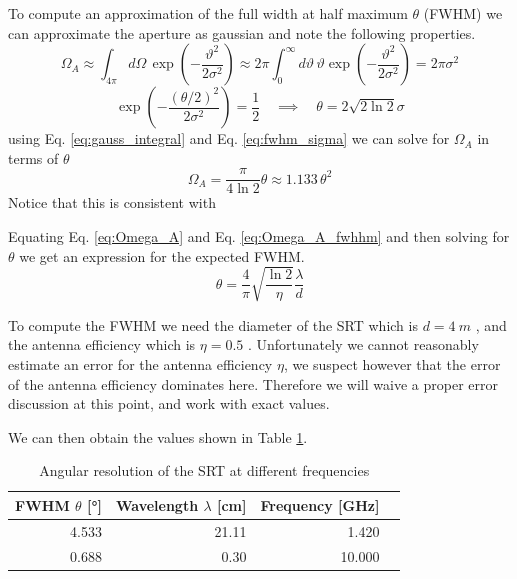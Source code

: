To compute an approximation of the full width at half maximum $\theta$ (FWHM) we can approximate the aperture as gaussian \cite[p. 2]{srt} and note the following properties.
\begin{equation}
    \Omega_A \approx \int_{4\pi } d\Omega\, \exp{\left( -\frac{\vartheta^2}{2\sigma^2} \right)} \approx 2\pi \int_0^{\infty} d\vartheta \, \vartheta \exp{\left( -\frac{\vartheta^2}{2\sigma^2} \right)} = 2\pi \sigma^2
    \label{eq:gauss_integral}
\end{equation}
\begin{equation}
    \exp{\left( -\frac{(\theta/2)^2}{2\sigma^2}\right)} = \frac{1}{2} \quad \implies \quad \theta = 2 \sqrt{2\ln{2}} \sigma \label{eq:fwhm_sigma}
\end{equation}
using Eq. \eqref{eq:gauss_integral} and Eq. \eqref{eq:fwhm_sigma} we can solve for $\Omega_A$ in terms of $\theta$
\begin{equation}
    \Omega_A = \frac{\pi}{4\ln{2}} \theta \approx 1.133 \, \theta^2 \label{eq:Omega_A_fwhhm}
\end{equation}
Notice that this is consistent with \cite[p.178 (8.13)]{wilson_tools_2009}

Equating Eq. \eqref{eq:Omega_A} and Eq. \eqref{eq:Omega_A_fwhhm} and then solving for $\theta$ we get an expression for the expected FWHM.
\begin{equation}
    \theta = \frac{4}{\pi} \sqrt{\frac{\ln{2}}{\eta}}\frac{\lambda}{d} \label{eq:fwhm}
\end{equation}

To compute the FWHM we need the diameter of the SRT which is $d = \SI{4}{m}$ \cite[p. 4]{srt}, and the antenna efficiency which is $\eta = 0.5$ \cite[p. 2]{srt}.
Unfortunately we cannot reasonably estimate an error for the antenna efficiency $\eta$, we suspect however that the error of the antenna efficiency dominates here.
Therefore we will waive a proper error discussion at this point, and work with exact values.

We can then obtain the values shown in Table \ref{tab:ang_res}.
\begin{table}[H]
    \centering
    \begin{tabular}{rrrr}
        \toprule
        FWHM $\theta$ [\si{\degree}] & Wavelength $\lambda$ [\si{cm}] & Frequency [\si{\giga \hertz}]\\
        \midrule
        \num{4.533} & \num{21.11} & \num{1.420}\\
        \num{0.688} & \num{0.30} & \num{10.000}\\
        \bottomrule
    \end{tabular}
    \caption{Angular resolution of the SRT at different frequencies}
    \label{tab:ang_res}
\end{table}
